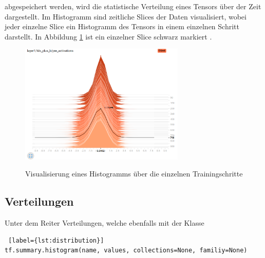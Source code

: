 abgespeichert werden, wird die statistische Verteilung eines Tensors über der Zeit dargestellt. Im Histogramm sind zeitliche \dq Slices\grqq{} der Daten visualisiert, wobei jeder einzelne Slice ein Histogramm des Tensors in einem einzelnen Schritt darstellt. In Abbildung \ref{fig:histogram} ist ein einzelner Slice schwarz markiert \cite{tensorboard.2017}.

\vspace{0.6cm}
\begin{figure}[h!]
	\centering
	 \includegraphics[width=0.7\textwidth]{images/Kapitel_3/histogram.png}\\
	\vspace{10pt} 
	\caption[Visualisierung eines Histogramms über die einzelnen Trainingsschritte]{Visualisierung eines Histogramms über die einzelnen Trainingschritte}\vspace{0.4cm}
	\label{fig:histogram}
\end{figure}






\subsection{Verteilungen}
\vspace{10pt}

Unter dem Reiter Verteilungen, welche ebenfalls mit der Klasse
\\

\begin{minipage}{\linewidth}
\begin{lstlisting} [label={lst:distribution}]
tf.summary.histogram(name, values, collections=None, familiy=None)
\end{lstlisting}
\end{minipage}
\vspace{0.2cm}

